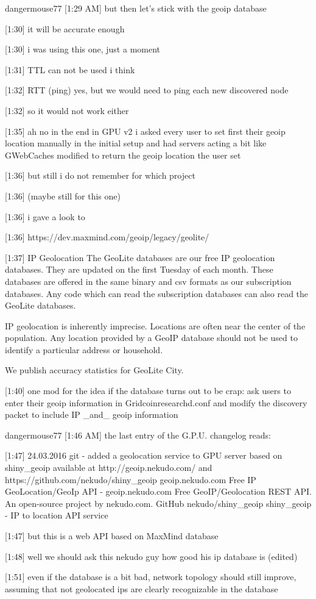 {dangermouse77 [1:29 AM] 
but then let's stick with the geoip database


[1:30] 
it will be accurate enough


[1:30] 
i was using this one, just a moment


[1:31] 
TTL can not be used i think


[1:32] 
RTT (ping) yes, but we would need to ping each new discovered node


[1:32] 
so it would not work either


[1:35] 
ah no in the end in GPU v2 i asked every user to set first their geoip location manually in the initial setup and had servers acting a bit like GWebCaches modified to return the geoip location the user set


[1:36] 
but still i do not remember for which project


[1:36] 
(maybe still for this one)


[1:36] 
i gave a look to


[1:36] 
https://dev.maxmind.com/geoip/legacy/geolite/


[1:37] 
IP Geolocation
The GeoLite databases are our free IP geolocation databases. They are updated on the first Tuesday of each month. These databases are offered in the same binary and csv formats as our subscription databases. Any code which can read the subscription databases can also read the GeoLite databases.

IP geolocation is inherently imprecise. Locations are often near the center of the population. Any location provided by a GeoIP database should not be used to identify a particular address or household.

We publish accuracy statistics for GeoLite City.


[1:40] 
one mod for the idea if the database turns out to be crap: ask users to enter their geoip information in Gridcoinresearchd.conf and modify the discovery packet to include IP _and_ geoip information


dangermouse77 [1:46 AM] 
the last entry of the G.P.U. changelog reads:


[1:47] 
24.03.2016 git
- added a geolocation service to GPU server based on shiny_geoip available at http://geoip.nekudo.com/ and 
https://github.com/nekudo/shiny_geoip
geoip.nekudo.com
Free IP GeoLocation/GeoIp API - geoip.nekudo.com
Free GeoIP/Geolocation REST API. An open-source project by nekudo.com.
 GitHub
nekudo/shiny_geoip
shiny_geoip - IP to location API service
 


[1:47] 
but this is a web API based on MaxMind database


[1:48] 
well we should ask this nekudo guy how good his ip database is (edited)


[1:51] 
even if the database is a bit bad, network topology should still improve, assuming that not geolocated ips are clearly recognizable in the database
}